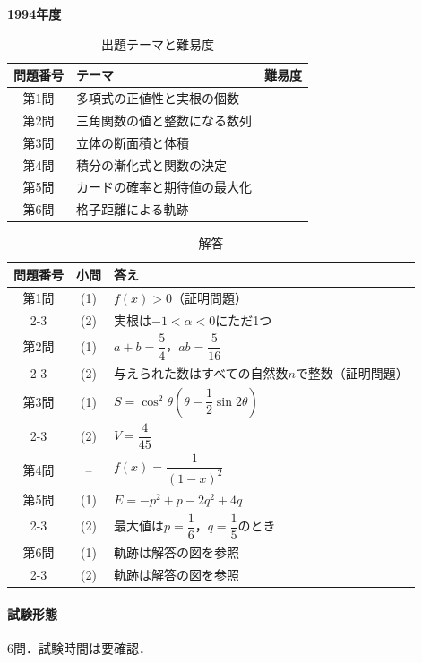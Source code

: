 \documentclass[../../main.tex]{subfiles}
\begin{document}
\begin{center}
  {\fontsize{48pt}{58pt}\selectfont \textbf{1994}\normalsize\textbf{年度}}
\end{center}

\begin{table}[htb]
  \centering
  \caption{出題テーマと難易度}
  \begin{tabular}{|c|p{9cm}|c|}
    \hline
    \textbf{問題番号} & \textbf{テーマ} & \textbf{難易度} \\
    \hline
    第1問 & 多項式の正値性と実根の個数 & \\
    \hline
    第2問 & 三角関数の値と整数になる数列 & \\
    \hline
    第3問 & 立体の断面積と体積 & \\
    \hline
    第4問 & 積分の漸化式と関数の決定 & \\
    \hline
    第5問 & カードの確率と期待値の最大化 & \\
    \hline
    第6問 & 格子距離による軌跡 & \\
    \hline
  \end{tabular}
\end{table}

\begin{table}[htb]
  \centering
  \caption{解答}
  \renewcommand{\arraystretch}{1.4}
  \begin{tabular}{|c|c|p{9cm}|}
    \hline
    \textbf{問題番号} & \textbf{小問} & \textbf{答え} \\
    \hline
    第1問 & (1) & $f(x)>0$（証明問題） \\
    \cline{2-3}
    & (2) & 実根は$-1<\alpha<0$にただ1つ \\
    \hline
    第2問 & (1) & $a+b=\dfrac{5}{4}$，$ab=\dfrac{5}{16}$ \\
    \cline{2-3}
    & (2) & 与えられた数はすべての自然数$n$で整数（証明問題） \\
    \hline
    第3問 & (1) & $S=\cos^2\theta\left(\theta-\dfrac{1}{2}\sin 2\theta\right)$ \\
    \cline{2-3}
    & (2) & $V=\dfrac{4}{45}$ \\
    \hline
    第4問 & -- & $f(x)=\dfrac{1}{(1-x)^2}$ \\
    \hline
    第5問 & (1) & $E=-p^2+p-2q^2+4q$ \\
    \cline{2-3}
    & (2) & 最大値は$p=\dfrac{1}{6}$，$q=\dfrac{1}{5}$のとき \\
    \hline
    第6問 & (1) & 軌跡は解答の図を参照 \\
    \cline{2-3}
    & (2) & 軌跡は解答の図を参照 \\
    \hline
  \end{tabular}
\end{table}

\paragraph{試験形態}
6問．試験時間は要確認．
\end{document}
